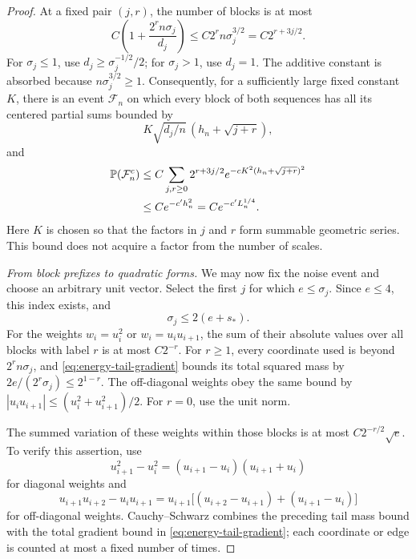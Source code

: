 \begin{proof}
At a fixed pair $(j,r)$, the number of blocks is at most
\[
 C\left(1+\frac{2^rn\sigma_j}{d_j}\right)
 \le C2^rn\sigma_j^{3/2}=C2^{r+3j/2}.
\]
For $\sigma_j\le1$, use $d_j\ge\sigma_j^{-1/2}/2$; for
$\sigma_j>1$, use $d_j=1$.  The additive constant is absorbed because
$n\sigma_j^{3/2}\ge1$.  Consequently, for a sufficiently large fixed
constant $K$, there is an event $\mathcal F_n$ on which every block of
both sequences has all its centered partial sums bounded by
\begin{equation}
 K\sqrt{d_j/n}\,(h_n+\sqrt{j+r}),
 \label{eq:block-prefix}
\end{equation}
and
\[
\begin{aligned}
 \mathbb P(\mathcal F_n^c)
 &\le C\sum_{j,r\ge0}2^{r+3j/2}
       e^{-cK^2(h_n+\sqrt{j+r})^2}\\
 &\le C e^{-c'h_n^2}=C e^{-c'L_n^{1/4}}.
\end{aligned}
\]
Here $K$ is chosen so that the factors in $j$ and $r$ form summable
geometric series.  This bound does not acquire a factor from the number
of scales.

\smallskip\noindent\emph{From block prefixes to quadratic forms.}
We may now fix the noise event and choose an arbitrary unit vector.
Select the first $j$ for which $e\le\sigma_j$. Since $e\le4$, this
index exists, and
\[
 \sigma_j\le2(e+s_*).
\]
For the weights $w_i=u_i^2$ or $w_i=u_iu_{i+1}$, the sum of their
absolute values over all blocks with label $r$ is at most $C2^{-r}$.
For $r\ge1$, every coordinate used is beyond $2^rn\sigma_j$, and
\eqref{eq:energy-tail-gradient} bounds its total squared mass by
$2e/(2^r\sigma_j)\le2^{1-r}$.  The off-diagonal weights obey the same
bound by $|u_iu_{i+1}|\le(u_i^2+u_{i+1}^2)/2$.  For $r=0$, use the
unit norm.

The summed variation of these weights within those blocks is at most
$C2^{-r/2}\sqrt e$.  To verify this assertion, use
\[
 u_{i+1}^2-u_i^2=(u_{i+1}-u_i)(u_{i+1}+u_i)
\]
for diagonal weights and
\[
 u_{i+1}u_{i+2}-u_iu_{i+1}
 =u_{i+1}\bigl[(u_{i+2}-u_{i+1})+(u_{i+1}-u_i)\bigr]
\]
for off-diagonal weights.  Cauchy--Schwarz combines the preceding tail
mass bound with the total gradient bound in
\eqref{eq:energy-tail-gradient}; each coordinate or edge is counted at
most a fixed number of times.


\end{proof}
